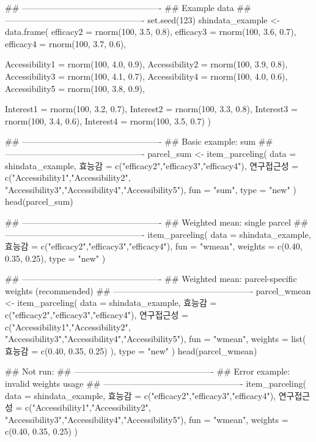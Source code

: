 \documentclass[a4paper]{book}
\begin{document}
%
\begin{Examples}
\begin{ExampleCode}
## -------------------------------------------------
## Example data
## -------------------------------------------------
set.seed(123)
shindata_example <- data.frame(
  efficacy2 = rnorm(100, 3.5, 0.8),
  efficacy3 = rnorm(100, 3.6, 0.7),
  efficacy4 = rnorm(100, 3.7, 0.6),

  Accessibility1 = rnorm(100, 4.0, 0.9),
  Accessibility2 = rnorm(100, 3.9, 0.8),
  Accessibility3 = rnorm(100, 4.1, 0.7),
  Accessibility4 = rnorm(100, 4.0, 0.6),
  Accessibility5 = rnorm(100, 3.8, 0.9),

  Interest1 = rnorm(100, 3.2, 0.7),
  Interest2 = rnorm(100, 3.3, 0.8),
  Interest3 = rnorm(100, 3.4, 0.6),
  Interest4 = rnorm(100, 3.5, 0.7)
)

## -------------------------------------------------
## Basic example: sum
## -------------------------------------------------
parcel_sum <- item_parceling(
  data = shindata_example,
  효능감 = c("efficacy2","efficacy3","efficacy4"),
  연구접근성 = c("Accessibility1","Accessibility2",
                  "Accessibility3","Accessibility4","Accessibility5"),
  fun = "sum",
  type = "new"
)
head(parcel_sum)

## -------------------------------------------------
## Weighted mean: single parcel
## -------------------------------------------------
item_parceling(
  data = shindata_example,
  효능감 = c("efficacy2","efficacy3","efficacy4"),
  fun = "wmean",
  weights = c(0.40, 0.35, 0.25),
  type = "new"
)

## -------------------------------------------------
## Weighted mean: parcel-specific weights (recommended)
## -------------------------------------------------
parcel_wmean <- item_parceling(
  data = shindata_example,
  효능감 = c("efficacy2","efficacy3","efficacy4"),
  연구접근성 = c("Accessibility1","Accessibility2",
                  "Accessibility3","Accessibility4","Accessibility5"),
  fun = "wmean",
  weights = list(
    효능감 = c(0.40, 0.35, 0.25)
  ),
  type = "new"
)
head(parcel_wmean)

\#\# Not run: 
## -------------------------------------------------
## Error example: invalid weights usage
## -------------------------------------------------
item_parceling(
  data = shindata_example,
  효능감 = c("efficacy2","efficacy3","efficacy4"),
  연구접근성 = c("Accessibility1","Accessibility2",
                  "Accessibility3","Accessibility4","Accessibility5"),
  fun = "wmean",
  weights = c(0.40, 0.35, 0.25)
)


\end{ExampleCode}
\end{Examples}
\end{document}
